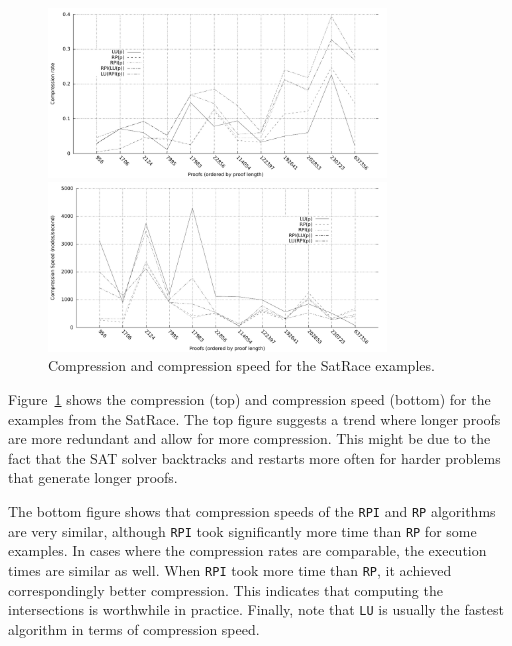\documentclass[envcountsame]{llncs}
\newcommand{\RP}{\texttt{\upshape RP}}
\newcommand{\RPI}{\texttt{\upshape RPI}}
\newcommand{\LU}{\texttt{\upshape LU}}
\begin{document}

\begin{figure}[t]
\centerline{\includegraphics[width=0.8\textwidth]{RatebyProofLength.pdf}}
\centerline{\includegraphics[width=0.8\textwidth]{SpeedbyProofLength.pdf}}
\caption{Compression and compression speed for the SatRace examples.}
\label{Fig:CompressionSatRace}
\end{figure}

Figure~\ref{Fig:CompressionSatRace} shows the compression (top) and compression
speed (bottom) for the examples from the SatRace. The top figure
suggests a trend where longer proofs are more redundant and allow for more
compression. This might be due to the fact that the SAT solver backtracks and
restarts more often for harder problems that generate longer proofs.

The bottom figure shows that compression speeds of the {\RPI} and {\RP}
algorithms are very similar, although {\RPI} took significantly more time than
{\RP} for some examples.
In cases where the compression rates are comparable, the execution times are
similar as well. When {\RPI} took more time than {\RP}, it achieved
correspondingly better compression. This indicates that computing the
intersections is worthwhile in practice. Finally, note that {\LU} is usually the fastest algorithm in terms of compression speed.
 
\end{document}
